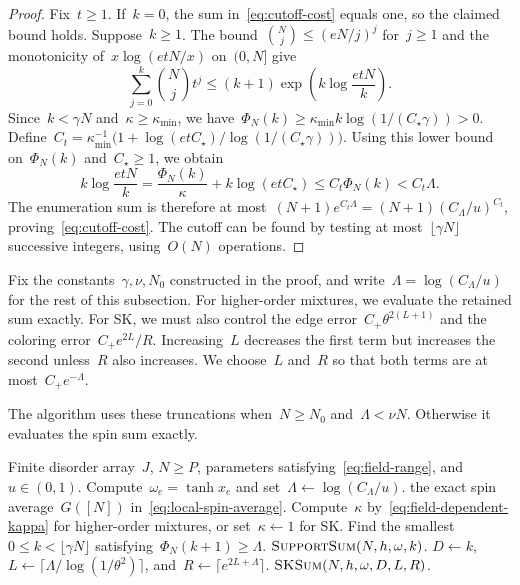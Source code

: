 \documentclass[letterpaper,11pt,reqno]{amsart}
\renewcommand{\leq}{\leqslant}
\renewcommand{\geq}{\geqslant}
\begin{document}
\begin{proof}
Fix~$t\geq1$. If~$k=0$, the sum in~\eqref{eq:cutoff-cost} equals one, so the claimed bound holds. Suppose~$k\geq1$. The bound~$\binom Nj\leq(eN/j)^j$ for~$j\geq1$ and the monotonicity of~$x\log(etN/x)$ on~$(0,N]$ give
\begin{equation*}
\sum_{j=0}^{k}\binom Nj t^j\leq(k+1)\exp\left(k\log\frac{etN}{k}\right).
\end{equation*}
Since~$k<\gamma N$ and~$\kappa\geq\kappa_{\min}$, we have~$\Phi_N(k)\geq\kappa_{\min}k\log(1/(C_\star\gamma))>0$. Define~$C_t=\kappa_{\min}^{-1}\bigl(1+\log(etC_\star)/\log(1/(C_\star\gamma))\bigr)$. Using this lower bound on~$\Phi_N(k)$ and~$C_\star\geq1$, we obtain
\begin{equation*}
k\log\frac{etN}{k}
=\frac{\Phi_N(k)}{\kappa}+k\log(etC_\star)
\leq C_t\Phi_N(k)<C_t\Lambda.
\end{equation*}
The enumeration sum is therefore at most~$(N+1)e^{C_t\Lambda}=(N+1)(C_\Lambda/u)^{C_t}$, proving~\eqref{eq:cutoff-cost}. The cutoff can be found by testing at most~$\lfloor\gamma N\rfloor$ successive integers, using~$O(N)$ operations.
\end{proof}

Fix the constants~$\gamma,\nu,N_0$ constructed in the proof, and write~$\Lambda=\log(C_\Lambda/u)$ for the rest of this subsection. For higher-order mixtures, we evaluate the retained sum exactly. For SK, we must also control the edge error~$C_+\theta^{2(L+1)}$ and the coloring error~$C_+e^{2L}/R$. Increasing~$L$ decreases the first term but increases the second unless~$R$ also increases. We choose~$L$ and~$R$ so that both terms are at most~$C_+e^{-\Lambda}$.

The algorithm uses these truncations when~$N\geq N_0$ and~$\Lambda<\nu N$. Otherwise it evaluates the spin sum exactly.

\begin{algorithm}[!htbp]
\caption{\textsc{GraphApprox}$(N,\beta,h,J,u)$}\label{alg:graph-approx}
\begin{algorithmic}[1]
\Require Finite disorder array~$J$, $N\geq P$, parameters satisfying~\eqref{eq:field-range}, and~$u\in(0,1)$.
\State Compute~$\omega_e=\tanh x_e$ and set~$\Lambda\gets\log(C_\Lambda/u)$.
\If{$N<N_0$ or $\Lambda\geq\nu N$}
  \State \Return the exact spin average~$G([N])$ in~\eqref{eq:local-spin-average}.
\EndIf
\State Compute~$\kappa$ by~\eqref{eq:field-dependent-kappa} for higher-order mixtures, or set~$\kappa\gets1$ for SK.
\State Find the smallest~$0\leq k<\lfloor\gamma N\rfloor$ satisfying~$\Phi_N(k+1)\geq\Lambda$.
\If{$p_m\geq3$}
  \State \Return $\textsc{SupportSum}(N,h,\omega,k)$.
\Else
  \State $D\gets k$, $L\gets\lceil\Lambda/\log(1/\theta^2)\rceil$, and~$R\gets\lceil e^{2L+\Lambda}\rceil$.
  \State \Return $\textsc{SKSum}(N,h,\omega,D,L,R)$.
\EndIf
\end{algorithmic}
\end{algorithm}
\end{document}
